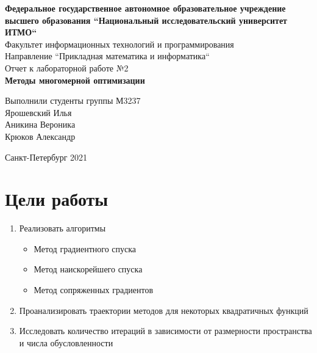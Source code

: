 \documentclass[english]{article}
\date{}
\title{}
\begin{document}
\begin{titlepage}
  \begin{center}
    \large\textbf{Федеральное государственное автономное образовательное учреждение высшего образования ``Национальный исследовательский университет ИТМО``} \\
    \vspace{0.5cm}
    Факультет информационных технологий и программирования \\
    \vspace{0.5cm}
    Направление ``Прикладная математика и информатика`` \\
    \vspace{3cm}
    Отчет к лабораторной работе №2 \\
    \vspace{0.5cm}
    \textbf{Методы многомерной оптимизации}
  \end{center}
  \vfill
  \begin{flushright}
    \large
    Выполнили студенты группы М3237 \\
    \vspace{0.5cm}
    Ярошевский Илья \\
    Аникина Вероника \\
    Крюков Александр
  \end{flushright}
  \vspace{3cm}
  \begin{center}
    Санкт-Петербург 2021
  \end{center}
\end{titlepage}

\section{Цели работы}

\begin{enumerate}
\item Реализовать алгоритмы
  \begin{itemize}
  \item Метод градиентного спуска
  \item Метод наискорейшего спуска
  \item Метод сопряженных градиентов
  \end{itemize}
\item Проанализировать траектории методов для некоторых квадратичных функций
\item Исследовать количество итераций в зависимости от размерности пространства и числа обусловленности
\end{enumerate}
\end{document}
